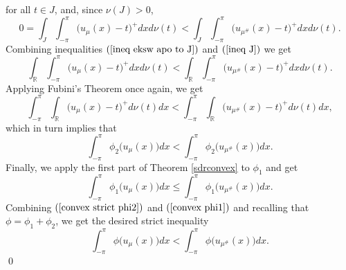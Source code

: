 \documentclass[11pt]{amsart}
\numberwithin{equation}{section}
\begin{document}
for all \(t\in J\), and, since \(\nu(J)>0\),
\begin{equation}\label{ineq J}
0=\int_J\int_{-\pi}^\pi\bigl(u_\mu(x)-t\bigr)^+dxd\nu(t)<\int_J\int_{-\pi}^\pi\bigl(u_{\mu^\#}(x)-t\bigr)^+dxd\nu(t).
\end{equation}
Combining inequalities \((\ref{ineq eksw apo to J})\) and \((\ref{ineq J})\) we get
\begin{equation*}
\int_{\mathbb{R}}\int_{-\pi}^\pi\bigl(u_\mu(x)-t\bigr)^+dxd\nu(t)<\int_{\mathbb{R}}\int_{-\pi}^\pi\bigl(u_{\mu^\#}(x)-t\bigr)^+dxd\nu(t).
\end{equation*}
Applying Fubini's Theorem once again, we get
\begin{equation*}
\int_{-\pi}^\pi\int_{\mathbb{R}}\bigl(u_\mu(x)-t\bigr)^+d\nu(t)dx<\int_{-\pi}^\pi\int_{\mathbb{R}}\bigl(u_{\mu^\#}(x)-t\bigr)^+d\nu(t)dx,
\end{equation*}
which in turn implies that
\begin{equation}\label{convex strict phi2}
\int_{-\pi}^\pi \phi_2\bigl(u_\mu(x)\bigr)dx<\int_{-\pi}^\pi \phi_2\bigl(u_{\mu^\#}(x)\bigr)dx.
\end{equation}
Finally, we apply the first part of Theorem \ref{sdrconvex} to \(\phi_1\) and get
\begin{equation}\label{convex phi1}
\int_{-\pi}^\pi \phi_1\bigl(u_\mu(x)\bigr)dx\leq\int_{-\pi}^\pi \phi_1\bigl(u_{\mu^\#}(x)\bigr)dx.
\end{equation}
Combining \((\ref{convex strict phi2})\) and \((\ref{convex phi1})\) and recalling that \(\phi=\phi_1+\phi_2\), we get the desired strict inequality
\begin{equation*}
\int_{-\pi}^\pi \phi\bigl(u_\mu(x)\bigr)dx<\int_{-\pi}^\pi \phi\bigl(u_{\mu^\#}(x)\bigr)dx.
\end{equation*}
\qed
\end{document}
